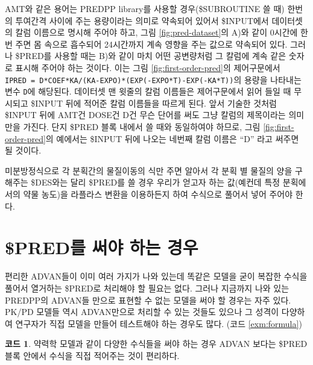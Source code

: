 \documentclass[
  11pt,
  krantz2,
  a4paper]{krantz}
\theoremstyle{definition}
\theoremstyle{definition}
\newtheorem{example}{코드}[chapter]
\theoremstyle{definition}
\theoremstyle{remark}
\begin{document}
AMT와 같은 용어는 PREDPP library를 사용할 경우(\$SUBROUTINE 쓸 때) 한번의 투여간격 사이에 주는 용량이라는 의미로 약속되어 있어서 \$INPUT에서 데이터셋의 칼럼 이름으로 명시해 주어야 하고, 그림 \ref{fig:pred-dataset}의 A)와 같이 0시간에 한번 주면 몸 속으로 흡수되어 24시간까지 계속 영향을 주는 값으로 약속되어 있다. 그러나 \$PRED를 사용할 때는 B)와 같이 마치 어떤 공변량처럼 그 칼럼에 계속 같은 숫자로 표시해 주어야 하는 것이다. 이는 그림 \ref{fig:first-order-pred}의 제어구문에서 \texttt{IPRED\ =\ D*COEF*KA/(KA-EXPO)*(EXP(-EXPO*T)-EXP(-KA*T))}의 용량을 나타내는 변수 \texttt{D}에 해당된다. 데이터셋 맨 윗줄의 칼럼 이름들은 제어구문에서 읽어 들일 때 무시되고 \$INPUT 뒤에 적어준 칼럼 이름들을 따르게 된다. 앞서 기술한 것처럼 \$INPUT 뒤에 AMT건 DOSE건 D건 무슨 단어를 써도 그냥 칼럼의 제목이라는 의미만을 가진다. 단지 \$PRED 블록 내에서 쓸 때와 동일하여야 하므로, 그림 \ref{fig:first-order-pred}의 예에서는 \$INPUT 뒤에 나오는 네번째 칼럼 이름은 ``D'' 라고 써주면 될 것이다. 

미분방정식으로 각 분획간의 물질이동의 식만 주면 알아서 각 분획 별 물질의 양을 구해주는 \$DES와는 달리 \$PRED를 쓸 경우 우리가 얻고자 하는 값(예컨데 특정 분획에서의 약물 농도)을 라플라스 변환을 이용하든지 하여 수식으로 풀어서 넣어 주어야 한다.

\hypertarget{preduxb97c-uxc368uxc57c-uxd558uxb294-uxacbduxc6b0}{%
\section{\$PRED를 써야 하는 경우}\label{preduxb97c-uxc368uxc57c-uxd558uxb294-uxacbduxc6b0}}


편리한 ADVAN들이 이미 여러 가지가 나와 있는데 똑같은 모델을 굳이 복잡한 수식을 풀어서 열거하는 \$PRED로 처리해야 할 필요는 없다. 그러나 지금까지 나와 있는 PREDPP의 ADVAN들 만으로 표현할 수 없는 모델을 써야 할 경우는 자주 있다. PK/PD 모델들 역시 ADVAN만으로 처리할 수 있는 것들도 있으나 그 성격이 다양하여 연구자가 직접 모델을 만들어 테스트해야 하는 경우도 많다. (코드 \ref{exm:formula})

\begin{example}
\protect\hypertarget{exm:formula}{}{\label{exm:formula} }약력학 모델과 같이 다양한 수식들을 써야 하는 경우 ADVAN 보다는 \$PRED 블록 안에서 수식을 직접 적어주는 것이 편리하다.
\end{example}
\end{document}
